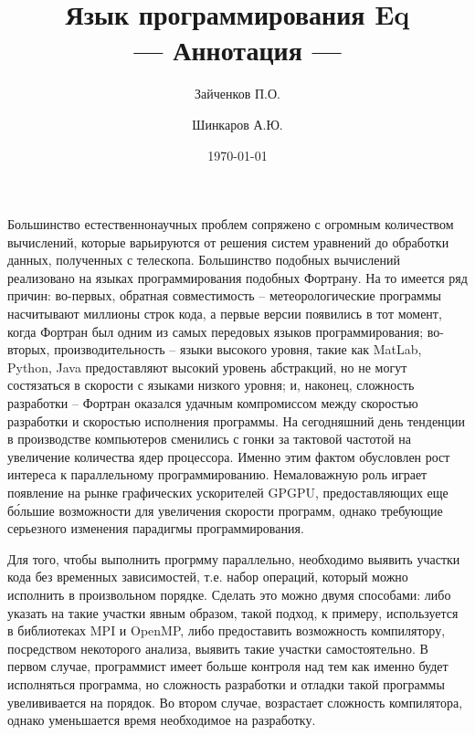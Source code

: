 \documentclass[a4paper]{llncs}
\author{Зайченков П.О.\inst{1} \and Шинкаров А.Ю.\inst{2}}
\date{\today}
\title{Язык программирования Eq \\
      --- Аннотация ---}
\institute{
  Московский физико-технический институт,
  Кафедра информатики и вычислительной техники
\and
  University of Hertfordshire,
  Hatfield, Hertfordshire,
  AL10 9AB, United Kingdom
}
\begin{document}
\maketitle

Большинство естественнонаучных проблем сопряжено с огромным
количеством вычислений, которые варьируются от решения систем
уравнений до обработки данных, полученных с телескопа.  Большинство
подобных вычислений реализовано на языках программирования подобных
Фортрану.  На то имеется ряд причин: во-первых, обратная совместимость
-- метеорологические программы насчитывают миллионы строк кода, а
первые версии появились в тот момент, когда Фортран был одним из самых
передовых языков программирования; во-вторых, производительность --
языки высокого уровня, такие как MatLab, Python, Java предоставляют
высокий уровень абстракций, но не могут состязаться в скорости с
языками низкого уровня; и, наконец, сложность разработки -- Фортран
оказался удачным компромиссом между скоростью разработки и скоростью
исполнения программы.  На сегодняшний день тенденции в производстве
компьютеров сменились с гонки за тактовой частотой на увеличение
количества ядер процессора.  Именно этим фактом обусловлен рост
интереса к параллельному программированию.  Немаловажную роль играет
появление на рынке графических ускорителей GPGPU, предоставляющих еще
б\'{о}льшие возможности для увеличения скорости программ, однако
требующие серьезного изменения парадигмы программирования.

Для того, чтобы выполнить прогрмму параллельно, необходимо выявить
участки кода без временных зависимостей, т.е. набор операций, который
можно исполнить в произвольном порядке.  Сделать это можно двумя
способами: либо указать на такие участки явным образом, такой подход,
к примеру, используется в библиотеках MPI и OpenMP, либо предоставить
возможность компилятору, посредством некоторого анализа, выявить такие
участки самостоятельно.  В первом случае, программист имеет больше
контроля над тем как именно будет исполняться программа, но сложность
разработки и отладки такой программы увелививается на порядок.  Во
втором случае, возрастает сложность компилятора, однако уменьшается
время необходимое на разработку.
\end{document}
